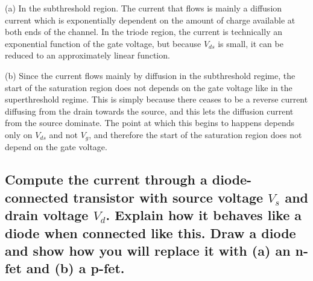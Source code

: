 (a) In the subthreshold region. The current that flows is mainly a diffusion current which is exponentially dependent on the
amount of charge available at both ends of the channel. In the triode region, the current is technically an exponential 
function of the gate voltage, but because \(V_{ds}\) is small, it can be reduced to an approximately linear function.

(b) Since the current flows mainly by diffusion in the subthreshold regime, the start of the saturation region does not
depends on the gate voltage like in the superthreshold regime. This is simply because there ceases to be a reverse current
diffusing from the drain towards the source, and this lets the diffusion current from the source dominate. The point at which
this begins to happens depends only on \(V_{ds}\) and not \(V_g\), and therefore the start of the saturation region does
not depend on the gate voltage.

\subsection{Compute the current through a diode-connected transistor with source voltage \(V_s\) and drain voltage \(V_d\).
    Explain how it behaves like a diode when connected like this. Draw a diode and show how you will replace it with (a) an n-fet
and (b) a p-fet.}


